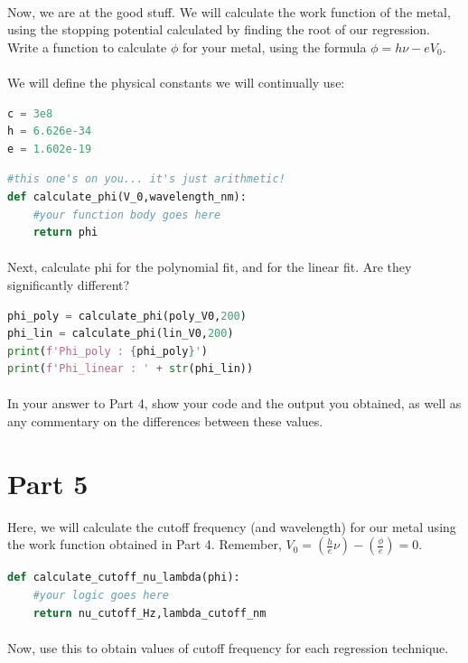 \documentclass{journal}
\begin{document}
\paragraph{}
Now, we are at the good stuff. We will calculate the work function of the metal, using the stopping potential calculated by finding the root of our regression. Write a function to calculate $\phi$ for your metal, using the formula $\phi = h\nu - e V_0$.
\paragraph{}
We will define the physical constants we will continually use:
\begin{lstlisting}[language=python]
c = 3e8
h = 6.626e-34
e = 1.602e-19
\end{lstlisting}
\begin{lstlisting}[language=python]
#this one's on you... it's just arithmetic!
def calculate_phi(V_0,wavelength_nm):
    #your function body goes here
    return phi
\end{lstlisting}
\paragraph{}
Next, calculate phi for the polynomial fit, and for the linear fit. Are they significantly different?
\begin{lstlisting}[language=python]
phi_poly = calculate_phi(poly_V0,200)
phi_lin = calculate_phi(lin_V0,200)    
print(f'Phi_poly : {phi_poly}')
print(f'Phi_linear : ' + str(phi_lin))
\end{lstlisting}
\paragraph{}
In your answer to Part 4, show your code and the output you obtained, as well as any commentary on the differences between these values.

\section*{Part 5}
Here, we will calculate the cutoff frequency (and wavelength) for our metal using the work function obtained in Part 4. Remember, $V_0 = (\frac{h}{e}\nu) - (\frac{\phi}{e}) = 0$.
\begin{lstlisting}[language=python]
def calculate_cutoff_nu_lambda(phi):
    #your logic goes here
    return nu_cutoff_Hz,lambda_cutoff_nm
\end{lstlisting}
\paragraph{}
Now, use this to obtain values of cutoff frequency for each regression technique.
\end{document}
